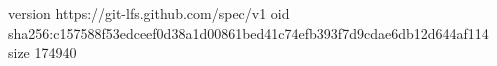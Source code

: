 version https://git-lfs.github.com/spec/v1
oid sha256:c157588f53edceef0d38a1d00861bed41c74efb393f7d9cdae6db12d644af114
size 174940
